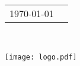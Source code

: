 \begin{titlepage}
\setcounter{footnote}{0}




{ \large
\begin{tabular}{rc}
\today
\end{tabular}\\[1cm]
}


\texttt{[image: logo.pdf]} %
 

\vfill %

\end{titlepage}
\restoregeometry


\setcounter{page}{2}%

\renewcommand{\abstractname}{Sammandrag}
\begin{abstract}

\end{abstract}

\renewcommand{\abstractname}{Abstract}
\begin{abstract}

\end{abstract}

\clearpage
\renewcommand{\contentsname}{Innehållsförteckning}
\tableofcontents

\clearpage
{}
\setcounter{page}{1}

\renewcommand{\thefootnote}{\arabic{footnote}}
\setcounter{footnote}{0}
